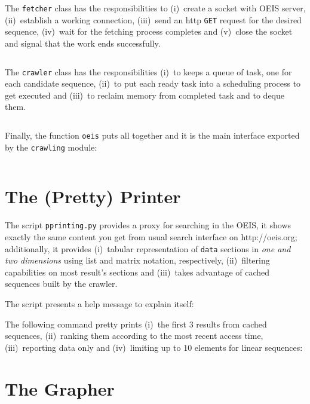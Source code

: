 The \verb|fetcher| class has the responsibilities to (i)~create a socket with
OEIS server, (ii)~establish a working connection, (iii)~send an http
\verb|GET| request for the desired sequence, (iv)~wait for the fetching process
completes and (v)~close the socket and signal that the work ends
successfully.
\inputminted[fontsize=\small,stripnl=false,firstline=41,lastline=86]
    {python}{deps/oeis-tools/src/crawling.py}

The \verb|crawler| class has the responsibilities
(i)~to keeps a queue of task, one for each candidate sequence,
(ii)~to put each ready task into a scheduling process to get executed and
(iii)~to reclaim memory from completed task and to deque them.
\inputminted[fontsize=\small,stripnl=false,firstline=89,lastline=117]
    {python}{deps/oeis-tools/src/crawling.py}

Finally, the function \verb|oeis| puts all together and it is the main
interface exported by the \verb|crawling| module:
\inputminted[fontsize=\small,stripnl=false,firstline=195,lastline=221]
    {python}{deps/oeis-tools/src/crawling.py}

\section{The (Pretty) Printer}

The script \verb|pprinting.py| provides a proxy for searching in the OEIS, it
shows exactly the same content you get from usual search interface on
http://oeis.org; additionally, it provides (i)~tabular representation of
\verb|data| sections in \textit{one and two dimensions} using list and matrix
notation, respectively, (ii)~filtering capabilities on most result's sections
and (iii)~takes advantage of cached sequences built by the crawler.

The script presents a help message to explain itself:


The following command pretty prints (i)~the first 3 results from cached
sequences, (ii)~ranking them according to the most recent access time,
(iii)~reporting data only and (iv)~limiting up to 10 elements for linear
sequences:


\section{The Grapher}

